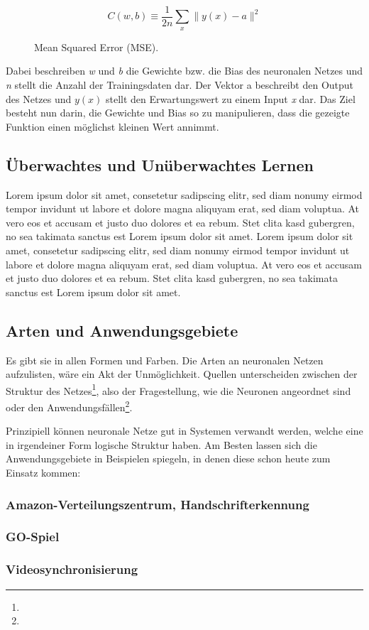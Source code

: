 \begin{figure}[H]
    \centering
    \[ C(w, b) \equiv
          \frac{1}{2n}\displaystyle\sum_{x}{\parallel y(x) - a\parallel^2}
    \]
    \caption{Mean Squared Error (MSE).}
    \label{fig:learn-function}
\end{figure}

Dabei beschreiben \textit{w} und \textit{b} die Gewichte bzw. die Bias des neuronalen Netzes und \textit{n} stellt die Anzahl der Trainingsdaten
dar. Der Vektor a beschreibt den Output des Netzes und \textit{\(y(x)\)} stellt den Erwartungswert zu einem Input \textit{x} dar.
Das Ziel besteht nun darin, die Gewichte und Bias so zu manipulieren, dass die gezeigte Funktion einen möglichst kleinen
Wert annimmt.

\subsection{Überwachtes und Unüberwachtes Lernen}
Lorem ipsum dolor sit amet, consetetur sadipscing elitr, sed diam nonumy eirmod tempor invidunt ut labore et dolore magna aliquyam erat, sed diam voluptua. At vero eos et accusam et justo duo dolores et ea rebum. Stet clita kasd gubergren, no sea takimata sanctus est Lorem ipsum dolor sit amet. Lorem ipsum dolor sit amet, consetetur sadipscing elitr, sed diam nonumy eirmod tempor invidunt ut labore et dolore magna aliquyam erat, sed diam voluptua. At vero eos et accusam et justo duo dolores et ea rebum. Stet clita kasd gubergren, no sea takimata sanctus est Lorem ipsum dolor sit amet.

\subsection{Arten und Anwendungsgebiete}

Es gibt sie in allen Formen und Farben. Die Arten an neuronalen Netzen aufzulisten, wäre ein Akt der Unmöglichkeit. Quellen unterscheiden zwischen der Struktur des Netzes\footnote{}, also der Fragestellung, wie die Neuronen angeordnet sind oder den Anwendungsfällen\footnote{}.

Prinzipiell können neuronale Netze gut in Systemen verwandt werden, welche eine in irgendeiner Form logische Struktur haben. Am Besten lassen sich die Anwendungsgebiete in Beispielen spiegeln, in denen diese schon heute zum Einsatz kommen:

\subsubsection*{Amazon-Verteilungszentrum, Handschrifterkennung}
\subsubsection*{GO-Spiel}
\subsubsection*{Videosynchronisierung}


